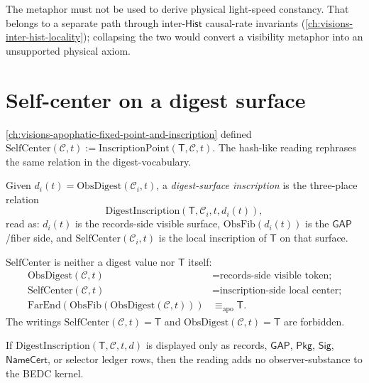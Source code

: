 The metaphor must not be used to derive physical light-speed constancy. That belongs to a separate path through inter-$\mathsf{Hist}$ causal-rate invariants (\autoref{ch:visions-inter-hist-locality}); collapsing the two would convert a visibility metaphor into an unsupported physical axiom.

\section{Self-center on a digest surface}
\label{sec:hash-like-self-center-on-digest}

\autoref{ch:visions-apophatic-fixed-point-and-inscription} defined $\mathrm{SelfCenter}(\mathcal{C}, t) := \mathrm{InscriptionPoint}(\mathsf{T}, \mathcal{C}, t)$. The hash-like reading rephrases the same relation in the digest-vocabulary.

\begin{definition}
\label{def:hash-like-digest-surface-inscription}
Given $d_i(t) = \mathrm{ObsDigest}(\mathcal{C}_i, t)$, a \emph{digest-surface inscription} is the three-place relation
$$
\mathrm{DigestInscription}(\mathsf{T}, \mathcal{C}_i, t, d_i(t)),
$$
read as: $d_i(t)$ is the records-side visible surface, $\mathrm{ObsFib}(d_i(t))$ is the $\mathsf{GAP}$/fiber side, and $\mathrm{SelfCenter}(\mathcal{C}_i, t)$ is the local inscription of $\mathsf{T}$ on that surface.
\end{definition}

\begin{principle}
\label{prin:hash-like-self-not-digest-not-T}
$\mathrm{SelfCenter}$ is neither a digest value nor $\mathsf{T}$ itself:
$$
\begin{aligned}
\mathrm{ObsDigest}(\mathcal{C}, t) &= \text{records-side visible token;} \\
\mathrm{SelfCenter}(\mathcal{C}, t) &= \text{inscription-side local center;} \\
\mathrm{FarEnd}(\mathrm{ObsFib}(\mathrm{ObsDigest}(\mathcal{C}, t))) &\equiv_{\mathrm{apo}} \mathsf{T}.
\end{aligned}
$$
The writings $\mathrm{SelfCenter}(\mathcal{C}, t) = \mathsf{T}$ and $\mathrm{ObsDigest}(\mathcal{C}, t) = \mathsf{T}$ are forbidden.
\end{principle}

\begin{theorem}
\label{thm:hash-like-no-subject-preservation}
If $\mathrm{DigestInscription}(\mathsf{T}, \mathcal{C}, t, d)$ is displayed only as records, $\mathsf{GAP}$, $\mathsf{Pkg}$, $\mathsf{Sig}$, $\mathsf{NameCert}$, or selector ledger rows, then the reading adds no observer-substance to the BEDC kernel.
\end{theorem}

